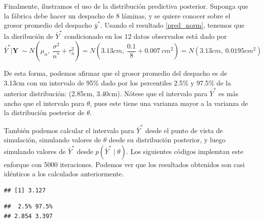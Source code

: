 \begin{Eje}
    Finalmente, ilustramos el uso de la distribuci\'on predictiva posterior. Suponga que la f\'abrica debe hacer un despacho de 8 l\'aminas, y se quiere conocer sobre el grosor promedio del despacho $\bar{y}^*$. Usando el resultado \ref{pred_norm}, tenemos que la disribuci\'on de $\bar{Y}^*$ condicionado en los 12 datos observados est\'a dado por 
    \begin{equation*}
    \bar{Y}^*|\mathbf{Y}\ \sim N\left(\mu_n,\ \frac{\sigma^2}{n^*}+\tau^2_n\right) = N\left(3.13cm,\ \frac{0.1}{8}+0.007\ cm^2\right) = N(3.13cm,\ 0.0195cm^2)
    \end{equation*}
    
    De esta forma, podemos afirmar que el grosor promedio del despacho es de 3.13cm con un intervalo de 95\% dado por los percentiles 2.5\% y 97.5\% de la anterior distribuci\'on: (2.85cm, 3.40cm). N\'otese que el intervalo para $\bar{Y}^{*}$ es m\'as ancho que el intervalo para $\theta$, pues este tiene una varianza mayor a la varianza de la distribuci\'on posterior de $\theta$.
    
    Tambi\'en podemos calcular el intervalo para $\bar{Y}^*$ desde el punto de vista de simulaci\'on, simulando valores de $\theta$ desde su distribuci\'on posterior, y luego simulando valores de $\bar{Y}^*$ desde $p(\bar{Y}^*\mid\theta)$. Los siguientes c\'odigos implemtan este enforque con 5000 iteraciones. Podemos ver que los resultados obtenidos son casi id\'enticos a los calculados anteriormente.
\begin{knitrout}
\color{fgcolor}\begin{kframe}
\begin{alltt}
 \hlkwb{<-} \hlstd{()}
 \hlkwb{<-}  \hlkwb{<-}  \hlkwb{<-} 
  \hlopt{:}\hlstd{)\{}
 \hlkwb{<-} \hlstd{(} 
 \hlkwb{<-} \hlstd{(} \hlopt{/}\hlstd{))}
\hlstd{\}}
\end{alltt}
\begin{verbatim}
## [1] 3.127
\end{verbatim}
\begin{alltt}
 \hlstd{(}\hlstd{,}\hlstd{))}
\end{alltt}
\begin{verbatim}
##  2.5% 97.5% 
## 2.854 3.397
\end{verbatim}
\end{kframe}
\end{knitrout}
    \end{Eje}
    
